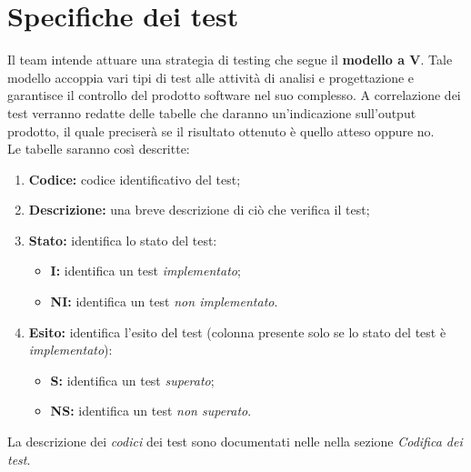 \section{Specifiche dei test}
Il team intende attuare una strategia di testing che segue il \textbf{modello a V}. Tale modello accoppia vari tipi di test alle attività di analisi e progettazione e garantisce il controllo del prodotto software nel suo complesso. A correlazione dei test verranno redatte delle tabelle che daranno un'indicazione sull'output prodotto, il quale preciserà se il risultato ottenuto è quello atteso oppure no.\\
Le tabelle saranno così descritte:
\begin{enumerate}
	\item \textbf{Codice:} codice identificativo del test;
	\item \textbf{Descrizione:} una breve descrizione di ciò che verifica il test;
	\item \textbf{Stato:} identifica lo stato del test:
	\begin{itemize}
		\item \textbf{I:} identifica un test \textit{implementato};
		\item \textbf{NI:} identifica un test \textit{non implementato}. 
	\end{itemize}
	\item \textbf{Esito:} identifica l'esito del test (colonna presente solo se lo stato del test è \textit{implementato}):
	\begin{itemize}
		\item \textbf{S:} identifica un test \textit{superato};
		\item \textbf{NS:} identifica un test \textit{non superato}. 
	\end{itemize}
\end{enumerate}
La descrizione dei \textit{codici} dei test sono documentati nelle  nella sezione \textit{Codifica dei test}.



